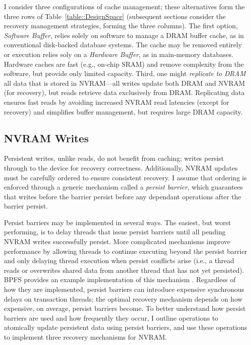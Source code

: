 I consider three configurations of cache management; these alternatives form the three rows of Table~\ref{table::DesignSpace} (subsequent sections consider the recovery management strategies, forming the three columns).
The first option, \emph{Software Buffer}, relies solely on software to manage a DRAM buffer cache, as in conventional disk-backed database systems.
The cache may be removed entirely or execution relies soly on a \emph{Hardware Buffer}, as in main-memory databases.
Hardware caches are fast (e.g., on-chip SRAM) and remove complexity from the software, but provide only limited capacity.
Third, one might \emph{replicate to DRAM} all data that is stored in NVRAM---all writes update both DRAM and NVRAM (for recovery), but reads retrieve data exclusively from DRAM.
Replicating data ensures fast reads by avoiding increased NVRAM read latencies (except for recovery) and simplifies buffer management, but requires large DRAM capacity.

\subsection{NVRAM Writes}
\label{sec:OLTP_design:Design:Writes}

Persistent writes, unlike reads, do not benefit from cach\-ing; writes persist through to the device for recovery correctness.
Additionally, NVRAM updates must be carefully ordered to ensure consistent recovery.
I assume that ordering is enforced through a generic mechanism called a \emph{persist barrier}, which guarantees that writes before the barrier persist before any dependant operations after the barrier persist.

Persist barriers may be implemented in several ways.
The easiest, but worst performing, is to delay threads that issue persist barriers until all pending NVRAM writes successfully persist.
More complicated mechanisms improve performance by allowing threads to continue executing beyond the persist barrier and only delaying thread execution when persist conflicts arise (i.e., a thread reads or overwrites shared data from another thread that has not yet persisted).
BPFS provides an example implementation of this mechanism \cite{ConditNightingale09}.
Regardless of how they are implemented, persist barriers can introduce expensive synchronous delays on transaction threads; the optimal recovery mechanism depends on how expensive, on average, persist barriers become.
To better understand how persist barriers are used and how frequently they occur, I outline operations to atomically update persistent data using persist barriers, and use these operations to implement three recovery mechanisms for NVRAM.

